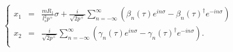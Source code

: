 \begin{equation}
\left \{
\begin{array}{rcl}
x_1 &=& \displaystyle{
    \frac{m R_1}{l_s^2 p^+} \sigma +  \frac{i}{\sqrt{2 p^+}} \sum_{n = -\infty}^{\infty}
                       \left( \beta_n(\tau) e^{i n \sigma} -
                           {\beta_n(\tau)}^{\dagger} e^{-i n \sigma} \right) }\\
x_2 &=& \displaystyle{
    \frac{i}{\sqrt{2 p^+}} \sum_{n = -\infty}^{\infty}
                       \left( \gamma_n(\tau) e^{ i n \sigma} -
                           {\gamma_n(\tau)}^{\dagger} e^{- i n \sigma} \right). }\\
\end{array}
\right.
\end{equation}

